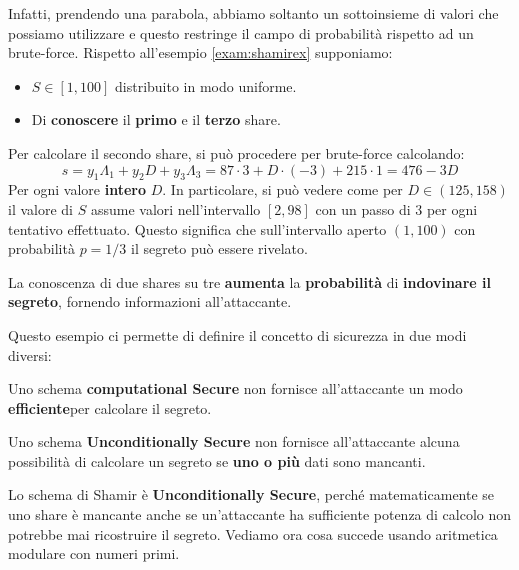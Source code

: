 Infatti, prendendo una parabola, abbiamo soltanto un sottoinsieme di valori che possiamo utilizzare e questo restringe il campo di probabilità rispetto ad un brute-force. Rispetto all'esempio \ref{exam:shamirex} supponiamo:
\begin{itemize}
    \item $S\in [1,100]$ distribuito in modo uniforme.
    \item Di \textbf{conoscere} il \textbf{primo} e il \textbf{terzo} share.
\end{itemize}
Per calcolare il secondo share, si può procedere per brute-force calcolando:
\[
s=y_1\Lambda_1+y_2D+y_3\Lambda_3=87\cdot3+D\cdot(-3)+215\cdot1=476-3D
\]
Per ogni valore \textbf{intero} $D$. In particolare, si può vedere come per $D\in(125,158)$ il valore di $S$ assume valori nell'intervallo $[2,98]$ con un passo di $3$ per ogni tentativo effettuato. Questo significa che sull'intervallo aperto $(1,100)$ con probabilità $p=1/3$ il segreto può essere rivelato.
\begin{note}
La conoscenza di due shares su tre \textbf{aumenta} la \textbf{probabilità} di \textbf{indovinare il segreto}, fornendo informazioni all'attaccante.
\end{note}
Questo esempio ci permette di definire il concetto di sicurezza in due modi diversi:
\begin{definition}
Uno schema \textbf{computational Secure} non fornisce all'attaccante un modo \textbf{efficiente}\footnotemark per calcolare il segreto.
\end{definition}
\begin{definition}
Uno schema \textbf{Unconditionally Secure} non fornisce all'attaccante alcuna possibilità di calcolare un segreto se \textbf{uno o più} dati sono mancanti.
\end{definition}
Lo schema di Shamir è \textbf{Unconditionally Secure}, perché matematicamente se uno share è mancante anche se un'attaccante ha sufficiente potenza di calcolo non potrebbe mai ricostruire il segreto. Vediamo ora cosa succede usando aritmetica modulare con numeri primi.
